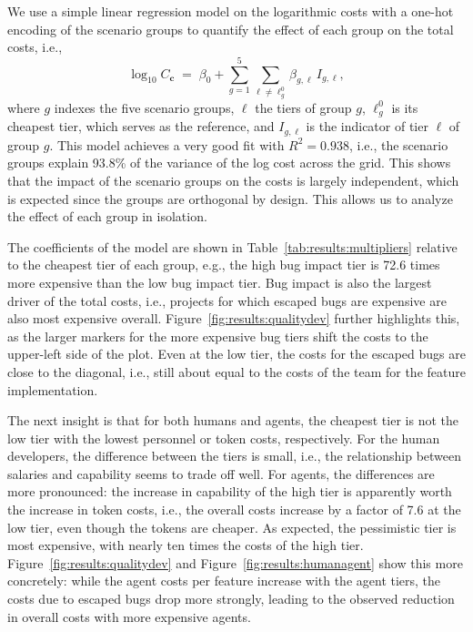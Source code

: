 \documentclass[smallextended]{svjour3}       %
\begin{document}
We use a simple linear regression model on the logarithmic costs with a one-hot encoding of the scenario groups to quantify the effect of each group on the total costs, i.e.,
\begin{equation}
  \log_{10} C_\mathbf{c} \;=\; \beta_0 + \sum_{g=1}^{5} \sum_{\ell \neq \ell^0_g} \beta_{g,\ell} \, I_{g,\ell},
  \label{eq:linreg}
\end{equation}
where $g$ indexes the five scenario groups, $\ell$ the tiers of group $g$, $\ell^0_g$ is its cheapest tier, which serves as the reference, and $I_{g,\ell}$ is the indicator of tier $\ell$ of group $g$. This model achieves a very good fit with $R^2 = 0.938$, i.e., the scenario groups explain 93.8\% of the variance of the log cost across the grid. This shows that the impact of the scenario groups on the costs is largely independent, which is expected since the groups are orthogonal by design. This allows us to analyze the effect of each group in isolation.

The coefficients of the model are shown in Table~\ref{tab:results:multipliers} relative to the cheapest tier of each group, e.g., the high bug impact tier is 72.6 times more expensive than the low bug impact tier. Bug impact is also the largest driver of the total costs, i.e., projects for which escaped bugs are expensive are also most expensive overall. Figure~\ref{fig:results:qualitydev} further highlights this, as the larger markers for the more expensive bug tiers shift the costs to the upper-left side of the plot. Even at the low tier, the costs for the escaped bugs are close to the diagonal, i.e., still about equal to the costs of the team for the feature implementation. 

The next insight is that for both humans and agents, the cheapest tier is not the low tier with the lowest personnel or token costs, respectively. For the human developers, the difference between the tiers is small, i.e., the relationship between salaries and capability seems to trade off well. For agents, the differences are more pronounced: the increase in capability of the high tier is apparently worth the increase in token costs, i.e., the overall costs increase by a factor of 7.6 at the low tier, even though the tokens are cheaper. As expected, the pessimistic tier is most expensive, with nearly ten times the costs of the high tier. Figure~\ref{fig:results:qualitydev} and Figure~\ref{fig:results:humanagent} show this more concretely: while the agent costs per feature increase with the agent tiers, the costs due to escaped bugs drop more strongly, leading to the observed reduction in overall costs with more expensive agents. 
\end{document}
